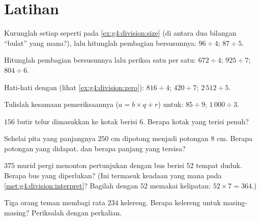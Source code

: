 \section{Latihan}

\begin{exercise}[$\star$]\label{exo:g4:division:1}
Kurunglah setiap  seperti pada \cref{ex:g4:division:size}
(di antara dua bilangan ``bulat'' yang mana?), lalu hitunglah
pembagian bersusunnya: $96 \div 4$; \quad $87 \div 5$.
\end{exercise}

\begin{exercise}[$\star$]\label{exo:g4:division:2}
Hitunglah pembagian bersusunnya lalu periksa satu per satu:
$672 \div 4$; \quad $925 \div 7$; \quad $804 \div 6$.
\end{exercise}

\begin{exercise}[$\star$]\label{exo:g4:division:3}
Hati-hati dengan  (lihat \cref{ex:g4:division:zero}):
$816 \div 4$; \quad $420 \div 7$; \quad $2\,512 \div 5$.
\end{exercise}

\begin{exercise}[$\star$]\label{exo:g4:division:4}
Tulislah kesamaan pemeriksaannya ($a = b \times q + r$) untuk:
$85 \div 9$; \quad $1\,000 \div 3$.
\end{exercise}

\begin{exercise}[$\star$]\label{exo:g4:division:5}
$156$ butir telur dimasukkan ke kotak berisi $6$. Berapa kotak yang terisi penuh?
\end{exercise}

\begin{exercise}[$\star$]\label{exo:g4:division:6}
Sehelai pita yang panjangnya $250$ cm dipotong menjadi potongan $8$ cm.
Berapa potongan yang didapat, dan berapa panjang yang tersisa?
\end{exercise}

\begin{exercise}[$\star$]\label{exo:g4:division:7}
$375$ murid pergi menonton pertunjukan dengan bus berisi $52$ tempat
duduk. Berapa bus yang diperlukan? (Ini termasuk keadaan yang mana
pada \cref{met:g4:division:interpret}? Bagilah dengan $52$ memakai
kelipatan: $52 \times 7 = 364$.)
\end{exercise}

\begin{exercise}[$\star$]\label{exo:g4:division:8}
Tiga orang teman membagi rata $234$ kelereng. Berapa kelereng untuk
masing-masing? Periksalah dengan perkalian.
\end{exercise}

